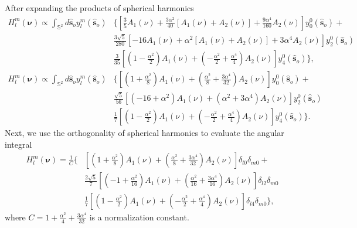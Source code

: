 \documentclass{osa-article}
\providecommand{\so}{\mathbf{\hat{s}}_o}
\providecommand{\mbb}[1]{\mathbb{#1}}
\providecommand{\bs}[1]{\boldsymbol{#1}}
\begin{document}
After expanding the products of spherical harmonics
\begin{align}
  H_l^m(\bs{\nu}) \propto \int_{\mbb{S}^2}d\so{}y_l^m(\so{})&\Bigg\{\left[\frac{3}{5}A_1(\nu) + \frac{3\alpha^2}{40}[A_1(\nu) + A_2(\nu)] + \frac{9\alpha^4}{160}A_2(\nu)\right]y_0^0(\so{})+\nonumber\\&\frac{3\sqrt{5}}{280}\left[-16A_1(\nu) + \alpha^2[A_1(\nu) + A_2(\nu)] + 3\alpha^4 A_2(\nu)\right]y_2^0(\so{})\nonumber\\&\frac{3}{35}\left[\left(1 - \frac{\alpha^2}{2}\right)A_1(\nu) + \left(-\frac{\alpha^2}{2} + \frac{\alpha^4}{4}\right)A_2(\nu)\right]y_4^0(\so{})\Bigg\},\\
  H_l^m(\bs{\nu}) \propto \int_{\mbb{S}^2}d\so{}y_l^m(\so{})&\Bigg\{\left[\left(1 + \frac{\alpha^2}{8}\right)A_1(\nu) + \left(\frac{\alpha^2}{8} + \frac{3\alpha^4}{32}\right)A_2(\nu)\right]y_0^0(\so{}) + \nonumber\\&\frac{\sqrt{5}}{56}\left[(-16 + \alpha^2)A_1(\nu) + (\alpha^2 + 3\alpha^4)A_2(\nu)\right]y_2^0(\so{})\nonumber\\&\frac{1}{7}\left[\left(1 - \frac{\alpha^2}{2}\right)A_1(\nu) + \left(-\frac{\alpha^2}{2} + \frac{\alpha^4}{4}\right)A_2(\nu)\right]y_4^0(\so{})\Bigg\}.
\end{align}
Next, we use the orthogonality of spherical harmonics to evaluate the angular integral
\begin{align}
  H_l^m(\bs{\nu}) = \frac{1}{C}\Bigg\{&\left[\left(1 + \frac{\alpha^2}{8}\right)A_1(\nu) + \left(\frac{\alpha^2}{8} + \frac{3\alpha^4}{32}\right)A_2(\nu)\right]\delta_{l0}\delta_{m0}+\nonumber\\&\frac{2\sqrt{5}}{7}\left[\left(-1 + \frac{\alpha^2}{16}\right)A_1(\nu) + \left(\frac{\alpha^2}{16} + \frac{3\alpha^4}{16}\right)A_2(\nu)\right]\delta_{l2}\delta_{m0}\nonumber\\&\frac{1}{7}\left[\left(1 - \frac{\alpha^2}{2}\right)A_1(\nu) + \left(-\frac{\alpha^2}{2} + \frac{\alpha^4}{4}\right)A_2(\nu)\right]\delta_{l4}\delta_{m0}\Bigg\}, 
\end{align}
where $C = 1 + \frac{\alpha^2}{4} + \frac{3\alpha^4}{32}$ is a normalization
constant.
\end{document}
